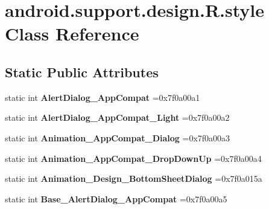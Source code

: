 \hypertarget{classandroid_1_1support_1_1design_1_1R_1_1style}{}\section{android.\+support.\+design.\+R.\+style Class Reference}
\label{classandroid_1_1support_1_1design_1_1R_1_1style}
\subsection*{Static Public Attributes}
\begin{DoxyCompactItemize}
\item 
\mbox{\label{classandroid_1_1support_1_1design_1_1R_1_1style_ade53afcd79f9a26eed01539fda14469c}} 
static int {\bfseries Alert\+Dialog\+\_\+\+App\+Compat} =0x7f0a00a1
\item 
\mbox{\label{classandroid_1_1support_1_1design_1_1R_1_1style_a99753a0296202a2c5a0291dc865ad834}} 
static int {\bfseries Alert\+Dialog\+\_\+\+App\+Compat\+\_\+\+Light} =0x7f0a00a2
\item 
\mbox{\label{classandroid_1_1support_1_1design_1_1R_1_1style_aab4f0d9d4668cd5253da434df2a55896}} 
static int {\bfseries Animation\+\_\+\+App\+Compat\+\_\+\+Dialog} =0x7f0a00a3
\item 
\mbox{\label{classandroid_1_1support_1_1design_1_1R_1_1style_add83b551c1c5b471c5be4bac246a4977}} 
static int {\bfseries Animation\+\_\+\+App\+Compat\+\_\+\+Drop\+Down\+Up} =0x7f0a00a4
\item 
\mbox{\label{classandroid_1_1support_1_1design_1_1R_1_1style_aedb60944a81d8b235ef34c11c0c3bf8e}} 
static int {\bfseries Animation\+\_\+\+Design\+\_\+\+Bottom\+Sheet\+Dialog} =0x7f0a015a
\item 
\mbox{\label{classandroid_1_1support_1_1design_1_1R_1_1style_ae1891d3efe2d9073fdfed380c11f3fec}} 
static int {\bfseries Base\+\_\+\+Alert\+Dialog\+\_\+\+App\+Compat} =0x7f0a00a5

\end{DoxyCompactItemize}
